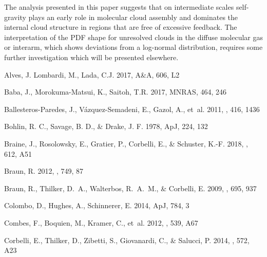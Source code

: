 \documentclass{aa}
\begin{document}
The analysis presented in this paper suggests that on intermediate
scales  self-gravity plays an early role in molecular cloud assembly and dominates
the internal cloud structure in regions that are free of excessive feedback.
The interpretation of the PDF shape for unresolved clouds in the diffuse molecular gas or interarm, 
which shows deviations from a log-normal distribution, requires some further investigation which
will be presented elsewhere.  

\begin{thebibliography}{}

 Alves, J. Lombardi, M., Lada, C.J. 2017, A\&A, 606, L2

 Baba, J., Morokuma-Matsui, K., Saitoh,
    T.R. 2017, MNRAS, 464, 246

{Ballesteros-Paredes}, J., {V{\'a}zquez-Semadeni}, E., {Gazol}, A., {et~al.}
  2011, \mnras, 416, 1436

 Bohlin, R. C., Savage, B. D., \& Drake, J. F.
    1978, ApJ, 224, 132

{Braine}, J., {Rosolowsky}, E., {Gratier}, P., {Corbelli}, E., \& {Schuster},
  K.-F. 2018, \aap, 612, A51

{Braun}, R. 2012, \apj, 749, 87

{Braun}, R., {Thilker}, D.~A., {Walterbos}, R.~A.~M., \& {Corbelli}, E. 2009,
  \apj, 695, 937
  
   Colombo, D., Hughes, A., Schinnerer,
    E. 2014, ApJ, 784, 3

{Combes}, F., {Boquien}, M., {Kramer}, C., {et~al.} 2012, \aap, 539, A67

{Corbelli}, E., {Thilker}, D., {Zibetti}, S., {Giovanardi}, C., \& {Salucci},
  P. 2014, \aap, 572, A23


\end{thebibliography}
\end{document}
